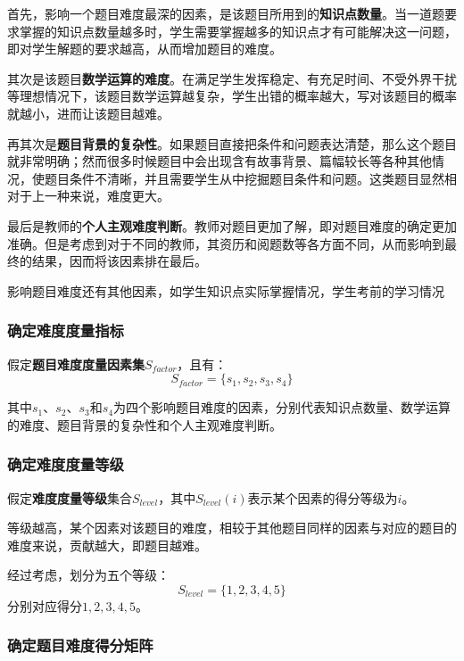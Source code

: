 首先，影响一个题目难度最深的因素，是该题目所用到的\textbf{知识点数量}。当一道题要求掌握的知识点数量越多时，学生需要掌握越多的知识点才有可能解决这一问题，即对学生解题的要求越高，从而增加题目的难度。

其次是该题目\textbf{数学运算的难度}。在满足学生发挥稳定、有充足时间、不受外界干扰等理想情况下，该题目数学运算越复杂，学生出错的概率越大，写对该题目的概率就越小，进而让该题目越难。

再其次是\textbf{题目背景的复杂性}。如果题目直接把条件和问题表达清楚，那么这个题目就非常明确；然而很多时候题目中会出现含有故事背景、篇幅较长等各种其他情况，使题目条件不清晰，并且需要学生从中挖掘题目条件和问题。这类题目显然相对于上一种来说，难度更大。

最后是教师的\textbf{个人主观难度判断}。教师对题目更加了解，即对题目难度的确定更加准确。但是考虑到对于不同的教师，其资历和阅题数等各方面不同，从而影响到最终的结果，因而将该因素排在最后。

影响题目难度还有其他因素，如学生知识点实际掌握情况，学生考前的学习情况

\subsubsection{确定难度度量指标}

假定\textbf{题目难度度量因素集}$S_{factor}$，且有：
\begin{equation}
    S_{factor} = \{ s_1, s_2, s_3, s_4 \}
\end{equation}

其中$s_1$、$s_2$、$s_3$和$s_4$为四个影响题目难度的因素，分别代表知识点数量、数学运算的难度、题目背景的复杂性和个人主观难度判断。

\subsubsection{确定难度度量等级}

假定\textbf{难度度量等级}集合$S_{level}$，其中$S_{level}(i)$表示某个因素的得分等级为$i$。

等级越高，某个因素对该题目的难度，相较于其他题目同样的因素与对应的题目的难度来说，贡献越大，即题目越难。

经过考虑，划分为五个等级：
$$S_{level} = \{1, 2, 3, 4, 5\}$$
分别对应得分$1, 2, 3, 4, 5$。

\subsubsection{确定题目难度得分矩阵}


